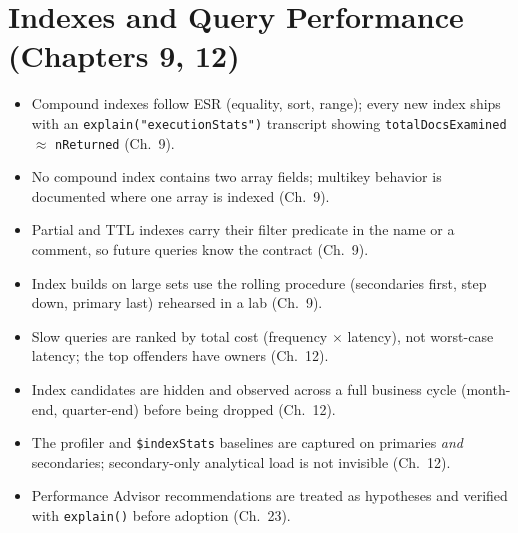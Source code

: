\section{Indexes and Query Performance (Chapters 9, 12)}
%
\begin{itemize}
    \item[$\square$] Compound indexes follow ESR (equality, sort, range); every new index ships with an \texttt{explain("executionStats")} transcript showing \texttt{totalDocsExamined} $\approx$ \texttt{nReturned} (Ch.~9).
    \item[$\square$] No compound index contains two array fields; multikey behavior is documented where one array is indexed (Ch.~9).
    \item[$\square$] Partial and TTL indexes carry their filter predicate in the name or a comment, so future queries know the contract (Ch.~9).
    \item[$\square$] Index builds on large sets use the rolling procedure (secondaries first, step down, primary last) rehearsed in a lab (Ch.~9).
    \item[$\square$] Slow queries are ranked by total cost (frequency $\times$ latency), not worst-case latency; the top offenders have owners (Ch.~12).
    \item[$\square$] Index candidates are hidden and observed across a full business cycle (month-end, quarter-end) before being dropped (Ch.~12).
    \item[$\square$] The profiler and \texttt{\$indexStats} baselines are captured on primaries \emph{and} secondaries; secondary-only analytical load is not invisible (Ch.~12).
    \item[$\square$] Performance Advisor recommendations are treated as hypotheses and verified with \texttt{explain()} before adoption (Ch.~23).
\end{itemize}

